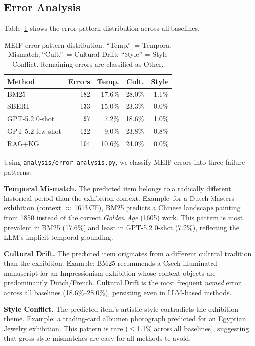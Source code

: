 \documentclass[11pt]{article}
\begin{document}
\subsection{Error Analysis}

Table~\ref{tab:errors} shows the error pattern distribution across all baselines.

\begin{table}[h]
\centering
\small
\begin{tabular}{lrrrr}
\toprule
\textbf{Method} & \textbf{Errors} & \textbf{Temp.} & \textbf{Cult.} & \textbf{Style} \\
\midrule
BM25             & 182 & 17.6\% & 28.0\% & 1.1\% \\
SBERT            & 133 & 15.0\% & 23.3\% & 0.0\% \\
GPT-5.2 0-shot   &  97 &  7.2\% & 18.6\% & 1.0\% \\
GPT-5.2 few-shot & 122 &  9.0\% & 23.8\% & 0.8\% \\
RAG+KG           & 104 & 10.6\% & 24.0\% & 0.0\% \\
\bottomrule
\end{tabular}
\caption{MEIP error pattern distribution. ``Temp.''\ = Temporal Mismatch;
  ``Cult.''\ = Cultural Drift; ``Style'' = Style Conflict.
  Remaining errors are classified as Other.}
\label{tab:errors}
\end{table}

Using \texttt{analysis/error\_analysis.py}, we classify MEIP errors into
three failure patterns:

\noindent\textbf{Temporal Mismatch.}
The predicted item belongs to a radically different historical period than the
exhibition context.
Example: for a Dutch Masters exhibition (context $\approx$\,1613\,CE), BM25
predicts a Chinese landscape painting from 1850 instead of the correct
\textit{Golden Age} (1605) work.
This pattern is most prevalent in BM25 (17.6\%) and least in GPT-5.2 0-shot
(7.2\%), reflecting the LLM's implicit temporal grounding.

\noindent\textbf{Cultural Drift.}
The predicted item originates from a different cultural tradition than the
exhibition.
Example: BM25 recommends a Czech illuminated manuscript for an Impressionism
exhibition whose context objects are predominantly Dutch/French.
Cultural Drift is the most frequent \emph{named} error across all baselines
(18.6\%--28.0\%), persisting even in LLM-based methods.

\noindent\textbf{Style Conflict.}
The predicted item's artistic style contradicts the exhibition theme.
Example: a trading-card albumen photograph predicted for an Egyptian Jewelry
exhibition.
This pattern is rare ($\leq$1.1\% across all baselines), suggesting that
gross style mismatches are easy for all methods to avoid.
\end{document}
